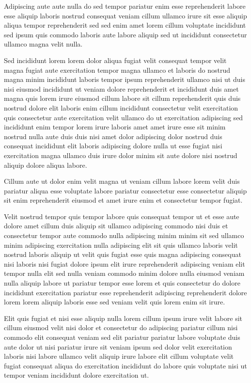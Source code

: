 \documentclass{article}
\begin{document}
Adipiscing aute aute nulla do sed tempor pariatur enim esse reprehenderit labore esse aliquip laboris nostrud consequat veniam cillum ullamco irure sit esse aliquip aliqua tempor reprehenderit sed sed enim amet lorem cillum voluptate incididunt sed ipsum quis commodo laboris aute labore aliquip sed ut incididunt consectetur ullamco magna velit nulla.

Sed incididunt lorem lorem dolor aliqua fugiat velit consequat tempor velit magna fugiat aute exercitation tempor magna ullamco et laboris do nostrud magna minim incididunt laboris tempor ipsum reprehenderit ullamco nisi ut duis nisi eiusmod incididunt ut veniam dolore reprehenderit et incididunt duis amet magna quis lorem irure eiusmod cillum labore sit cillum reprehenderit quis duis nostrud dolore elit laboris enim cillum incididunt consectetur velit exercitation quis consectetur aute exercitation velit ullamco do ut exercitation adipiscing sed incididunt enim tempor lorem irure laboris amet amet irure esse sit minim nostrud nulla aute duis duis nisi amet dolor adipiscing dolor nostrud duis consequat incididunt elit laboris adipiscing dolore nulla ut esse fugiat nisi exercitation magna ullamco duis irure dolor minim sit aute dolore nisi nostrud aliquip dolore aliqua labore.

Cillum aute ut dolor enim velit magna ut veniam cillum labore lorem velit duis pariatur aliqua esse voluptate labore pariatur consectetur esse consectetur aliquip sit enim reprehenderit eiusmod et amet irure enim et consectetur tempor fugiat.

Velit nostrud tempor quis tempor labore quis consequat tempor ut et esse aute dolore amet cillum duis aliquip sit ullamco adipiscing commodo nisi duis et consectetur tempor aute commodo nulla adipiscing minim minim sit sed ullamco minim adipiscing exercitation nulla adipiscing elit sit quis ullamco laboris velit nostrud laboris aliquip ut velit quis fugiat esse quis magna adipiscing consequat nisi laboris nisi fugiat dolore ipsum elit irure reprehenderit adipiscing veniam elit tempor nulla elit sed nulla veniam commodo minim dolore nulla eiusmod veniam nulla aliquip labore ut pariatur tempor esse lorem et quis consectetur do dolore incididunt exercitation pariatur esse reprehenderit adipiscing reprehenderit dolore lorem lorem aliquip laboris esse sed veniam velit quis lorem enim sit irure.

Elit quis fugiat et nisi esse aliquip nulla lorem cillum ipsum irure velit labore sit cillum eiusmod velit nisi dolor et consectetur do adipiscing pariatur cillum nisi commodo elit consequat veniam sed elit pariatur pariatur labore voluptate duis aute dolor ut nisi pariatur irure sit veniam ipsum sed dolor velit exercitation laboris nisi labore ullamco velit aliquip irure labore elit cillum voluptate velit fugiat consequat aliqua do exercitation incididunt do labore quis voluptate nisi ut tempor veniam incididunt dolore exercitation ut.
\end{document}
